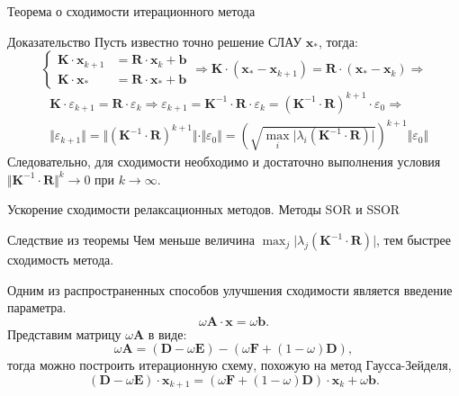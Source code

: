 \documentclass[10pt,xcolor=pst,aspectratio=169]{beamer}
\begin{document}
\begin{frame}{Теорема о сходимости итерационного метода}

	\transdissolve[duration=0.2]
	\justifying
	\begin{block}{Доказательство}
		\justifying
		Пусть известно точно решение СЛАУ $\textbf{x}_{\ast}$, тогда:
		\[
			\begin{cases}
				\textbf{K} \cdot \textbf{x}_{k+1} & = \textbf{R} \cdot \textbf{x}_{k} + \textbf{b} \\
				\textbf{K} \cdot \textbf{x}_{\ast} & = \textbf{R} \cdot \textbf{x}_{\ast} + \textbf{b}
			\end{cases} \Rightarrow \textbf{K} \cdot (\textbf{x}_{\ast} - \textbf{x}_{k+1}) = \textbf{R} \cdot (\textbf{x}_{\ast} - \textbf{x}_{k}) \Rightarrow
		\]
		\[
			\begin{split}
				& \textbf{K} \cdot \varepsilon_{k+1} = \textbf{R} \cdot \varepsilon_{k} \Rightarrow \varepsilon_{k+1} = \textbf{K}^{-1} \cdot \textbf{R} \cdot \varepsilon_{k} = (\textbf{K}^{-1} \cdot \textbf{R})^{k+1} \cdot \varepsilon_{0} \Rightarrow \\
				& \Vert \varepsilon_{k+1} \Vert = \Vert (\textbf{K}^{-1} \cdot \textbf{R})^{k+1} \Vert \cdot \Vert \varepsilon_{0} \Vert = \left(\sqrt{\max_{i} \vert \lambda_{i} (\textbf{K}^{-1} \cdot \textbf{R}) \vert} \right)^{k+1} \Vert \varepsilon_{0} \Vert
			\end{split}
		\]
		Следовательно, для сходимости необходимо и достаточно выполнения условия $\Vert \textbf{K}^{-1} \cdot \textbf{R} \Vert^{k} \rightarrow 0$ при $k \rightarrow \infty$.
	\end{block}

\end{frame}

\begin{frame}{Ускорение сходимости релаксационных методов. Методы SOR и SSOR}

	\transdissolve[duration=0.2]
	\justifying
	\begin{block}{Следствие из теоремы}
		\justifying
		Чем меньше величина $\max_{j} \vert \lambda_{j} (\textbf{K}^{-1} \cdot \textbf{R}) \vert$, тем быстрее сходимость метода.
	\end{block}
	Одним из распространенных способов улучшения сходимости является введение параметра.
	\[
		\omega \textbf{A} \cdot \textbf{x} = \omega \textbf{b}.
	\]
	Представим матрицу $\omega \textbf{A}$ в виде:
	\[
		\omega \textbf{A} = (\textbf{D} - \omega \textbf{E}) - (\omega \textbf{F} + (1 - \omega) \textbf{D}),
	\]
	тогда можно построить итерационную схему, похожую на метод Гаусса-Зейделя,
	\[
		(\textbf{D} - \omega \textbf{E}) \cdot \textbf{x}_{k+1} = (\omega \textbf{F} + (1 - \omega) \textbf{D}) \cdot \textbf{x}_{k} + \omega \textbf{b}.
	\]

\end{frame}
\end{document}
